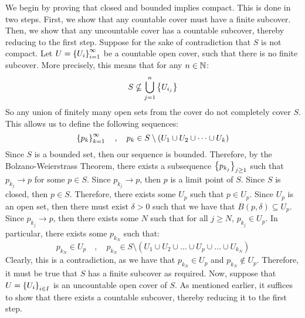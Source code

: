 \documentclass{article}
\begin{document}
\begin{pf}
    We begin by proving that closed and bounded implies compact. This is done in two steps.
    First, we show that any countable cover must have a finite subcover.
    Then, we show that any uncountable cover has a countable subcover,
    thereby reducing to the first step. \vsp
    Suppose for the sake of contradiction that $ S $ is not compact.
    Let $ U = \left\{{U_{i}}\right\}_{i=1}^{\infty} $ be a countable open cover,
    such that there is no finite subcover.
    More precisely, this means that for any $ n \in \mathbb{N} $:
    \begin{equation*}
        S \nsubseteq \bigcup_{j = 1}^{n} \left\{{U_{i_{j}}}\right\} 
    \end{equation*}
    So any union of finitely many open sets from the cover do not completely cover $ S $.
    This allows us to define the following sequences:
    \begin{equation*}
        \left\{{p_{k}}\right\}_{k=1}^{\infty} \quad , \quad p_{k} \in
        S \setminus (U_{1} \cup U_{2} \cup \dots \cup U_{k})
    \end{equation*}
    Since $ S $ is a bounded set, then our sequence is bounded.
    Therefore, by the Bolzano-Weierstrass Theorem, there exists a subsequence
    $ \left\{{p_{k_{j}}}\right\}_{j \geq 1} $ such that $ p_{k_{j}} \rightarrow p $ for some $ p \in S $. \vsp
    Since $ p_{k_{j}} \rightarrow p $, then $ p $ is a limit point of $ S $.
    Since $ S $ is closed, then $ p \in S $.
    Therefore, there exists some $ U_{p} $ such that $ p \in U_{p} $.
    Since $ U_{p} $ is an open set, then there must exist $ \delta > 0 $ such that
    we have that $ B(p, \delta) \subseteq U_{p} $. \vsp
    Since $ p_{k_{j}} \rightarrow p $, then there exists some $ N $ such that
    for all $ j \geq N $, $ p_{k_{j}} \in U_{p} $.
    In particular, there exists some $ p_{k_{N}} $ such that:
    \begin{equation*}
        p_{k_{N}} \in U_{p} \quad , \quad p_{k_{N}} \in
        S \setminus (U_{1} \cup U_{2} \cup \dots \cup U_{p} \cup \dots \cup U_{k_{N}})
    \end{equation*}
    Clearly, this is a contradiction, as we have that
    $ p_{k_{N}} \in U_{p} $ and $ p_{k_{N}} \notin U_{p} $.
    Therefore, it must be true that $ S $ has a finite subcover as required. \vsp
    Now, suppose that $ U = \left\{{U_{i}}\right\}_{i \in I} $ is an uncountable open cover of $ S $.
    As mentioned earlier, it suffices to show that there exists a countable subcover,
    thereby reducing it to the first step. \vsp

\end{pf}
\end{document}
